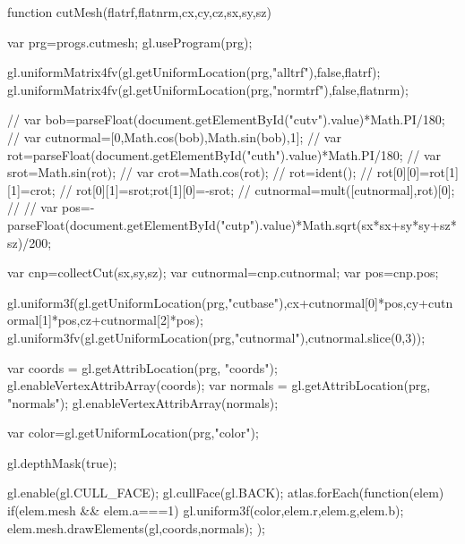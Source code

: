             function cutMesh(flatrf,flatnrm,cx,cy,cz,sx,sy,sz){
                var prg=progs.cutmesh;
                gl.useProgram(prg);
        
                gl.uniformMatrix4fv(gl.getUniformLocation(prg,"alltrf"),false,flatrf);
                gl.uniformMatrix4fv(gl.getUniformLocation(prg,"normtrf"),false,flatnrm);
                
//                var bob=parseFloat(document.getElementById("cutv").value)*Math.PI/180;
//                var cutnormal=[0,Math.cos(bob),Math.sin(bob),1];
//                var rot=parseFloat(document.getElementById("cuth").value)*Math.PI/180;
//                var srot=Math.sin(rot);
//                var crot=Math.cos(rot);
//                rot=ident();
//                rot[0][0]=rot[1][1]=crot;
//                rot[0][1]=srot;rot[1][0]=-srot;
//                cutnormal=mult([cutnormal],rot)[0];
//                
//                var pos=-parseFloat(document.getElementById("cutp").value)*Math.sqrt(sx*sx+sy*sy+sz*sz)/200;

                var cnp=collectCut(sx,sy,sz);
                var cutnormal=cnp.cutnormal;
                var pos=cnp.pos;

                gl.uniform3f(gl.getUniformLocation(prg,"cutbase"),cx+cutnormal[0]*pos,cy+cutnormal[1]*pos,cz+cutnormal[2]*pos);
                gl.uniform3fv(gl.getUniformLocation(prg,"cutnormal"),cutnormal.slice(0,3));
 
                var coords = gl.getAttribLocation(prg, "coords");
                gl.enableVertexAttribArray(coords);
                var normals = gl.getAttribLocation(prg, "normals");
                gl.enableVertexAttribArray(normals);
                
                var color=gl.getUniformLocation(prg,"color");
                
                gl.depthMask(true);
                
                gl.enable(gl.CULL_FACE);
                gl.cullFace(gl.BACK);
                atlas.forEach(function(elem){
                    if(elem.mesh && elem.a===1){
                        gl.uniform3f(color,elem.r,elem.g,elem.b);
                        elem.mesh.drawElements(gl,coords,normals);
                    }
                });
            }
